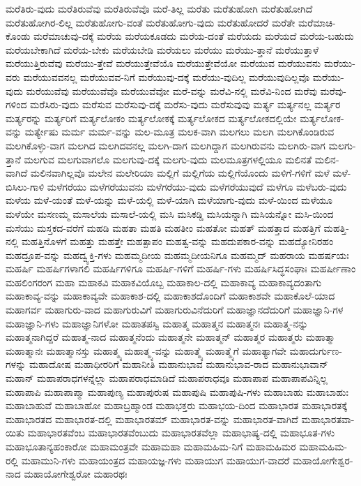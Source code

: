 {ಮರೆತಿರು-ವುದು
ಮರೆತಿರುವೆವು
ಮರೆತಿರುವೆವೊ
ಮರೆ-ತಿಲ್ಲ
ಮರೆತು
ಮರೆತುಹೋಗಿ
ಮರೆತುಹೋಗಿದೆ
ಮರೆತುಹೋಗಿರ-ಲಿಲ್ಲ
ಮರೆತುಹೋಗು-ವಂತೆ
ಮರೆತುಹೋಗು-ವುದು
ಮರೆತುಹೋದರೆ
ಮರೆತೇ
ಮರೆಮಾಚಿ-ಕೊಂಡು
ಮರೆಮಾಚುವು-ದಕ್ಕೆ
ಮರೆಯ
ಮರೆಯಕೂಡದು
ಮರೆಯ-ದಂತೆ
ಮರೆಯದು
ಮರೆಯದೆ
ಮರೆಯ-ಬಹುದು
ಮರೆಯಬೇಕಾಗಿದೆ
ಮರೆಯ-ಬೇಕು
ಮರೆಯಬೇಡಿ
ಮರೆಯಲು
ಮರೆಯು
ಮರೆಯು-ತ್ತಾನೆ
ಮರೆಯುತ್ತಾಳೆ
ಮರೆಯುತ್ತಿರುವೆವು
ಮರೆಯು-ತ್ತೇವೆ
ಮರೆಯುತ್ತೇವೆಯೊ
ಮರೆಯುತ್ತೇವೆಯೋ
ಮರೆಯುವ
ಮರೆಯುವನು
ಮರೆಯು-ವರು
ಮರೆಯುವವನಲ್ಲ
ಮರೆಯುವವ-ನಿಗೆ
ಮರೆಯುವು-ದಕ್ಕೆ
ಮರೆಯು-ವುದಿಲ್ಲ
ಮರೆಯುವುದಿಲ್ಲವೊ
ಮರೆಯು-ವುದು
ಮರೆಯುವೆವು
ಮರೆಯುವೆವೊ
ಮರೆಯುವೆವೋ
ಮರೆ-ವನ್ನು
ಮರೆವಿ-ನಲ್ಲಿ
ಮರೆವಿ-ನಿಂದ
ಮರೆವು
ಮರೆವು-ಗಳಿಂದ
ಮರೆಸಿರು-ವುದು
ಮರೆಸುವ
ಮರೆಸುವು-ದಕ್ಕೆ
ಮರೆಸು-ವುದು
ಮರೆಸುವುವು
ಮರ್ತ್ಯ
ಮರ್ತ್ಯನಲ್ಲ
ಮರ್ತ್ಯರ
ಮರ್ತ್ಯರನ್ನು
ಮರ್ತ್ಯರಿಗೆ
ಮರ್ತ್ಯಲೋಕಂ
ಮರ್ತ್ಯಲೋಕಕ್ಕೆ
ಮರ್ತ್ಯಲೋಕದ
ಮರ್ತ್ಯಲೋಕದಲ್ಲಿಯೇ
ಮರ್ತ್ಯಲೋಕ-ವನ್ನು
ಮರ್ತ್ಯೇಷು
ಮರ್ಮ
ಮರ್ಮ-ವನ್ನು
ಮಲ-ಮೂತ್ರ
ಮಲಕ-ವಾಗಿ
ಮಲಗಲು
ಮಲಗಿ
ಮಲಗಿಕೊಂಡಿರುವ
ಮಲಗಿಕೊಳ್ಳು-ವಾಗ
ಮಲಗಿದ
ಮಲಗಿದವನಲ್ಲ
ಮಲಗಿ-ದಾಗ
ಮಲಗಿದ್ದಾಗ
ಮಲಗಿರುವನು
ಮಲಗಿರು-ವಾಗ
ಮಲಗು-ತ್ತಾನೆ
ಮಲಗುವ
ಮಲಗುವಾಗಲೊ
ಮಲಗುವು-ದಕ್ಕೆ
ಮಲಗು-ವುದು
ಮಲಮೂತ್ರಗಳಲ್ಲಿಯೂ
ಮಲಿನತೆ
ಮಲಿನ-ವಾಗಿದೆ
ಮಲಿನವಾಗಿಲ್ಲವೊ
ಮಲೇನ
ಮಲೇರಿಯಾ
ಮಲ್ಲಿಗೆ
ಮಲ್ಲಿಗೆಯ
ಮಲ್ಲಿಗೆಯೊಂದು
ಮಳಿಗೆ-ಗಳಿಗೆ
ಮಳೆ
ಮಳೆ-ಬಿಸಿಲು-ಗಾಳಿ
ಮಳೆಗರೆಯು
ಮಳೆಗರೆಯುವನು
ಮಳೆಗರೆಯು-ವುದು
ಮಳೆಗರೆಯುವುದೆ
ಮಳೆಗೂ
ಮಳೆಬರು-ವುದು
ಮಳೆಯ
ಮಳೆ-ಯಂತೆ
ಮಳೆ-ಯನ್ನು
ಮಳೆ-ಯಲ್ಲಿ
ಮಳೆ-ಯಾಗಿ
ಮಳೆಯಾಗು-ವುದು
ಮಳೆ-ಯಿಂದ
ಮಳೆಯೂ
ಮಳೆಯೇ
ಮಸಣಮ್ಮ
ಮಸಾಲೆಯ
ಮಸಾಲೆ-ಯಲ್ಲಿ
ಮಸಿ
ಮಸಿಕಡ್ಡಿ
ಮಸಿಯನ್ನಾಗಿ
ಮಸಿಯನ್ನೋ
ಮಸಿ-ಯಿಂದ
ಮಸೆಯು
ಮಸ್ತಕದ-ವರೆಗೆ
ಮಹಡಿ
ಮಹತಾ
ಮಹತಿ
ಮಹತೀಂ
ಮಹತೋ
ಮಹತ್
ಮಹತ್ತಾದ
ಮಹತ್ತಿಗೆ
ಮಹತ್ತಿ-ನಲ್ಲಿ
ಮಹತ್ತಿನೊಳಗೆ
ಮಹತ್ತು
ಮಹತ್ತೇ
ಮಹತ್ಪಾಪಂ
ಮಹತ್ವ-ವನ್ನು
ಮಹದುಪಕಾರ-ವನ್ನು
ಮಹದ್ಯೋನಿರಹಂ
ಮಹದ್ರೂಪ-ವನ್ನು
ಮಹದ್ವ್ಯಕ್ತಿ-ಗಳು
ಮಹಮ್ಮದೀಯ
ಮಹಮ್ಮದೀಯನಿಗೂ
ಮಹಮ್ಮದ್
ಮಹರಾಯ
ಮಹರ್ಷಯಃ
ಮಹರ್ಷಿ
ಮಹರ್ಷಿಗಳಾಗಲಿ
ಮಹರ್ಷಿಗಳಿಗೂ
ಮಹರ್ಷಿ-ಗಳಿಗೆ
ಮಹರ್ಷಿ-ಗಳು
ಮಹರ್ಷಿಸಿದ್ಧಸಂಘಾಃ
ಮಹರ್ಷೀಣಾಂ
ಮಹಲಿಂಗರಂಗ
ಮಹಾ
ಮಹಾಕವಿ
ಮಹಾಕವಿಯೊಬ್ಬ
ಮಹಾಕಾಲ-ದಲ್ಲಿ
ಮಹಾಕಾವ್ಯ
ಮಹಾಕಾವ್ಯದಂತಾಗು
ಮಹಾಕಾವ್ಯ-ವನ್ನು
ಮಹಾಕಾವ್ಯವೇ
ಮಹಾಕಾಶ-ದಲ್ಲಿ
ಮಹಾಕಾಶದೊಂದಿಗೆ
ಮಹಾಕಾಶವೇ
ಮಹಾಕೊಲೆ-ಯಾದ
ಮಹಾಗರ್ವ
ಮಹಾಗುರು-ವಾದ
ಮಹಾಗುರುವಿಗೆ
ಮಹಾಗುರುವಿನೆದುರಿಗೆ
ಮಹಾಜ್ಞಾನದೆದುರಿಗೆ
ಮಹಾಜ್ಞಾನಿ-ಗಳ
ಮಹಾಜ್ಞಾನಿ-ಗಳು
ಮಹಾಜ್ಞಾನಿಗಳೋ
ಮಹಾತಪಸ್ವಿ
ಮಹಾತ್ಮ
ಮಹಾತ್ಮನ
ಮಹಾತ್ಮನಃ
ಮಹಾತ್ಮ-ನನ್ನು
ಮಹಾತ್ಮನಾಗಿದ್ದರೆ
ಮಹಾತ್ಮ-ನಾದ
ಮಹಾತ್ಮನೆಂದು
ಮಹಾತ್ಮನೇ
ಮಹಾತ್ಮನ್
ಮಹಾತ್ಮರ
ಮಹಾತ್ಮರು
ಮಹಾತ್ಮಾ
ಮಹಾತ್ಮಾನಃ
ಮಹಾತ್ಮಾನಸ್ತು
ಮಹಾತ್ಮ್ಯ
ಮಹಾತ್ಮ್ಯ-ವನ್ನು
ಮಹಾತ್ಮ್ಯೆ
ಮಹಾತ್ಮ್ಯೆಗೆ
ಮಹಾತ್ಯಾಗವೇ
ಮಹಾದುರ್ಗುಣ-ಗಳನ್ನು
ಮಹಾದೋಷ
ಮಹಾಧೀರರಿಗೆ
ಮಹಾನೀತಿ
ಮಹಾನುಭಾವ
ಮಹಾನುಭಾವ-ರಾದ
ಮಹಾನುಭಾವಾನ್
ಮಹಾನ್
ಮಹಾಪರಾಧಗಳನ್ನೆಲ್ಲಾ
ಮಹಾಪರಾಧಮಾಡಿದೆ
ಮಹಾಪರಾಧವೂ
ಮಹಾಪಾಪ
ಮಹಾಪಾಪವಿನ್ನಿಲ್ಲ
ಮಹಾಪಾಪಿ
ಮಹಾಪಾಪ್ಮಾ
ಮಹಾಪುಣ್ಯ
ಮಹಾಪುರುಷ
ಮಹಾಪುಷಿ
ಮಹಾಪುಷಿ-ಗಳು
ಮಹಾಬಾಹು
ಮಹಾಬಾಹುಃ
ಮಹಾಬಾಹುವೆ
ಮಹಾಬಾಹೋ
ಮಹಾಬ್ರಹ್ಮಾಂಡ
ಮಹಾಭಕ್ತರು
ಮಹಾಭಯ-ದಿಂದ
ಮಹಾಭಾರತ
ಮಹಾಭಾರತಕ್ಕೆ
ಮಹಾಭಾರತದ
ಮಹಾಭಾರತ-ದಲ್ಲಿ
ಮಹಾಭಾರತಮ್
ಮಹಾಭಾರತ-ವನ್ನು
ಮಹಾಭಾರತ-ವಾಗಿದೆ
ಮಹಾಭಾರತವಾ-ಯಿತು
ಮಹಾಭಾರತವೆಂಬ
ಮಹಾಭಾರತವೆಂಬುದು
ಮಹಾಭಾರತವೆಲ್ಲಾ
ಮಹಾಭಾಷ್ಯ-ದಲ್ಲಿ
ಮಹಾಭೂತ-ಗಳು
ಮಹಾಭೂತಾನ್ಯಹಂಕಾರೋ
ಮಹಾಮಂತ್ರವೇ
ಮಹಾಮಹಾ
ಮಹಾಮಹಿಮ-ನಿಗೆ
ಮಹಾಮಹಿಮರ
ಮಹಾಮಹಿಮ-ರಲ್ಲಿ
ಮಹಾಮುನಿ-ಗಳು
ಮಹಾಯಂತ್ರದ
ಮಹಾಯಜ್ಞ-ಗಳು
ಮಹಾಯುಗ
ಮಹಾಯುಗ-ವಾದರೆ
ಮಹಾಯೋಗೇಶ್ವರ-ನಾದ
ಮಹಾಯೋಗೇಶ್ವರೋ
ಮಹಾರಥಃ
}
